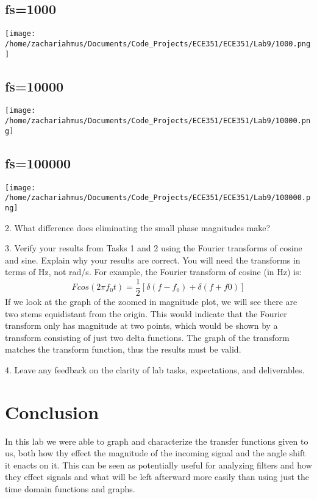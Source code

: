 \documentclass[12pt,a4paper]{article}
\begin{document}
\begin{center}
	\subsection*{fs=1000}
	\texttt{[image: /home/zachariahmus/Documents/Code\_Projects/ECE351/ECE351/Lab9/1000.png]}
\end{center}

\begin{center}
	\subsection*{fs=10000}
	\texttt{[image: /home/zachariahmus/Documents/Code\_Projects/ECE351/ECE351/Lab9/10000.png]}
\end{center}

\begin{center}
	\subsection*{fs=100000}
	\texttt{[image: /home/zachariahmus/Documents/Code\_Projects/ECE351/ECE351/Lab9/100000.png]}
\end{center}
2. What difference does eliminating the small phase magnitudes make?\vspace*{12pt}

3. Verify your results from Tasks 1 and 2 using the Fourier transforms of cosine and sine.
Explain why your results are correct. You will need the transforms in terms of Hz, not rad/s.
For example, the Fourier transform of cosine (in Hz) is:
$$F {cos (2\pi f_0t)} = \frac{1}{2} [\delta (f - f_0) + \delta (f + f0)]$$
\vspace*{12pt}
If we look at the graph of the zoomed in magnitude plot, we will see there are two stems equidistant from the origin. This would indicate that the Fourier transform only has magnitude at two points, which would be shown by a transform consisting of just two delta functions. The graph of the transform matches the transform function, thus the results must be valid. 

4. Leave any feedback on the clarity of lab tasks, expectations, and deliverables.


\section*{Conclusion}
In this lab we were able to graph and characterize the transfer functions given to us, both how thy effect the magnitude of the incoming signal and the angle shift it enacts on it. This can be seen as potentially useful for analyzing filters and how they effect signals and what will be left afterward more easily than using just the time domain functions and graphs. 

	
\end{document}
